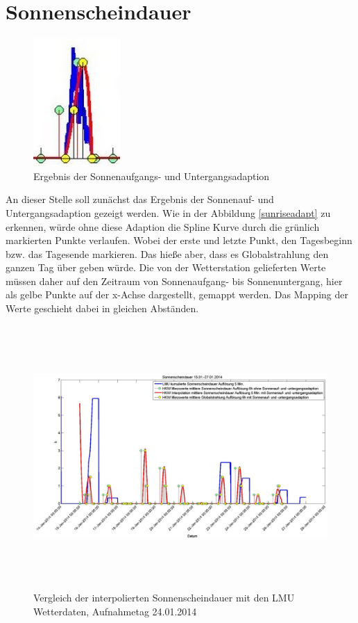 \section{Sonnenscheindauer}
\begin{figure}
\centering
\includegraphics{analyse/sunriseadaption}
\caption{Ergebnis der Sonnenaufgangs- und Untergangsadaption}
\label{fig:sunriseadapt}
\end{figure}
An dieser Stelle soll zunächst das Ergebnis der Sonnenauf- und Untergangsadaption gezeigt werden. Wie in der Abbildung \ref{sunriseadapt} zu erkennen, würde ohne diese Adaption die Spline Kurve durch die grünlich markierten Punkte verlaufen. Wobei der erste und letzte Punkt, den Tagesbeginn bzw. das Tagesende markieren. Das hieße aber, dass es Globalstrahlung den ganzen Tag über geben würde. Die von der Wetterstation gelieferten Werte müssen daher auf den Zeitraum von Sonnenaufgang- bis Sonnenuntergang, hier als gelbe Punkte auf der x-Achse dargestellt, gemappt werden. Das Mapping der Werte geschieht dabei in gleichen Abständen.
\begin{figure}[htbp]
\centering
\includegraphics[width=16cm,height=10cm]{analyse/sonnensdauer2}
\caption{Vergleich der interpolierten Sonnenscheindauer mit den LMU Wetterdaten, Aufnahmetag 24.01.2014}
\label{fig:sonnensdauer}
\end{figure}
